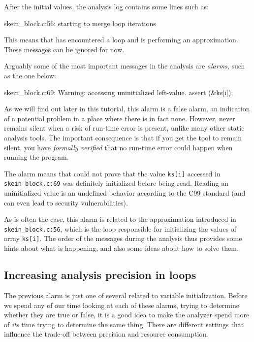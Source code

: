 \documentclass{frama-c-book}
\newcommand{\isoc}{\textsf{C99}}
\begin{document}
After the initial values, the analysis log contains some lines such as:

\begin{logsmath}
[eva] skein_block.c:56: starting to merge loop iterations
\end{logsmath}

This means that \Eva{} has encountered a loop and is performing an
approximation. These messages can be ignored for now.

Arguably some of the most important messages in the analysis are {\em alarms},
such as the one below:

\begin{logsmath}
 skein_block.c:69: Warning:
  accessing uninitialized left-value. assert \initialized(&ks[i]);
\end{logsmath}

As we will find out later in this tutorial, this alarm is a false
alarm, an indication of a potential problem in a place where there is
in fact none. However, \Eva{} never remains
silent when a risk of run-time error is present, unlike many other
static analysis tools. The important consequence is that if you get
the tool to remain silent, you have {\em formally verified} that
no run-time error could happen when running the program.

The alarm means that \Eva{} could not prove that the value \verb|ks[i]|
accessed in \verb|skein_block.c:69| was definitely initialized before being
read. Reading an uninitialized value is an undefined behavior according to the
\isoc{} standard (and can even lead to security vulnerabilities).

As is often the case, this alarm is related to the approximation introduced
in \verb|skein_block.c:56|, which is the loop responsible for initializing
the values of array \verb|ks[i]|. The order of the messages during the
analysis thus provides some hints about what is happening, and also some
ideas about how to solve them.

\subsection{Increasing analysis precision in loops}

The previous alarm is just one of several related to variable initialization.
Before we spend any of our time looking at each of these alarms,
trying to determine whether they are true or false,
it is a good idea to make the analyzer spend more of {\em its} time
trying to determine the same thing.
There are different settings that influence the trade-off
between precision and resource consumption.
\end{document}
